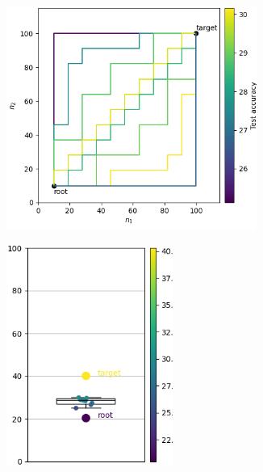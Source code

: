 \documentclass{article}
\begin{document}
\begin{figure}[htbp]
    \centering
    \begin{subfigure}[b]{0.29\textwidth}
        \centering
        \includegraphics[width=0.9\textwidth]{imgs/pathes_CIFAR10_random_2024_05_02_15_49_40.png}
    \end{subfigure}
    \begin{subfigure}[b]{0.29\textwidth}
        \centering
        \includegraphics[width=0.6\textwidth]{imgs/box_plot_CIFAR10_random_2024_05_02_15_49_41.png}
    \end{subfigure}
    

\end{figure}
\end{document}
